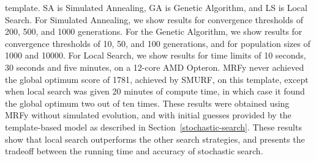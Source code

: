 \documentclass[blockstyle,times,preprint]{sigplanconf}
\begin{document}
\begin{small}
\begin{table}[htb]
{template. SA is Simulated Annealing, GA is Genetic Algorithm, and LS is Local
Search. For Simulated Annealing, we show results for convergence thresholds of
200, 500, and 1000 generations. 
For the Genetic Algorithm, we show results for convergence thresholds of 10, 
50, and 100 generations, and for population sizes of 1000 and 10000.
For Local Search, we show results for time limits of 10 seconds, 30 seconds and 
five minutes, on a 12-core AMD Opteron.
MRFy never achieved the global optimum score of 1781, achieved by SMURF, on this
template, except when local search was given 20 minutes of compute time, in
which case it found the global optimum two out of ten times.
These results were obtained using MRFy without simulated evolution,
and with initial guesses provided by the template-based model as described in 
Section~\ref{stochastic-search}.
These results show that local search outperforms the other search strategies,
and presents the tradeoff between the running time and accuracy of stochastic 
search.}
\end{table}
\end{small}
\end{document}
